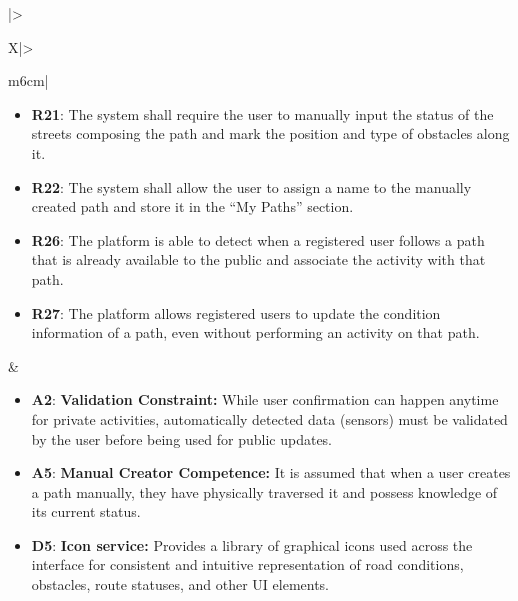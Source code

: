 \begin{table}[H]
\begin{tabularx}{\textwidth}{|>{\raggedright\arraybackslash}X|>{\raggedright\arraybackslash}m{6cm}|}
\begin{minipage}[t]{\linewidth}
\begin{itemize}[leftmargin=*, nosep, label={}]
            \item \textbf{R21}: The system shall require the user to manually input the status of the streets composing the path and mark the position and type of obstacles along it.
            \item \textbf{R22}: The system shall allow the user to assign a name to the manually created path and store it in the “My Paths” section.
            \item \textbf{R26}: The platform is able to detect when a registered user follows a path that is already available to the public and associate the activity with that path.
            \item \textbf{R27}: The platform allows registered users to update the condition information of a path, even without performing an activity on that path.
        \end{itemize}
        \end{minipage}
        &
        \begin{minipage}[t]{\linewidth}
        \begin{itemize}[leftmargin=*, nosep, label={}]
            \item \textbf{A2}: \textbf{Validation Constraint:} While user confirmation can happen anytime for private activities, automatically detected data (sensors) must be validated by the user before being used for public updates.
            \item \textbf{A5}: \textbf{Manual Creator Competence:} It is assumed that when a user creates a path manually, they have physically traversed it and possess knowledge of its current status.
            \item \textbf{D5}: \textbf{Icon service:} Provides a library of graphical icons used across the interface for consistent and intuitive representation of road conditions, obstacles, route statuses, and other UI elements.
        \end{itemize}
        \end{minipage}
        \\ \hline
    \end{tabularx}
    \caption{Requirement Mapping for G2}
    \label{tab:mapping_g2}
\end{table}

